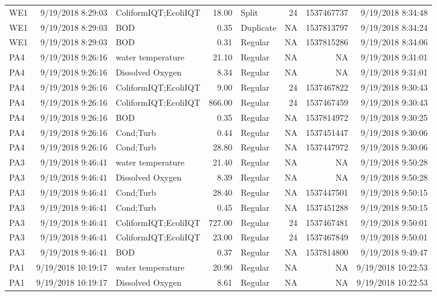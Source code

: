 \documentclass[
  letterpaper,
  DIV=11,
  numbers=noendperiod]{scrartcl}
\begin{document}
\begin{longtable*}{lrlrlrrr}
WE1 & 9/19/2018 8:29:03 & ColiformIQT;EcoliIQT & 18.00 & Split & 24 & 1537467737 & 9/19/2018 8:34:48 \\ 
WE1 & 9/19/2018 8:29:03 & BOD & 0.35 & Duplicate & NA & 1537813797 & 9/19/2018 8:34:24 \\ 
WE1 & 9/19/2018 8:29:03 & BOD & 0.31 & Regular & NA & 1537815286 & 9/19/2018 8:34:06 \\ 
PA4 & 9/19/2018 9:26:16 & water temperature & 21.10 & Regular & NA & NA & 9/19/2018 9:31:01 \\ 
PA4 & 9/19/2018 9:26:16 & Dissolved Oxygen & 8.34 & Regular & NA & NA & 9/19/2018 9:31:01 \\ 
PA4 & 9/19/2018 9:26:16 & ColiformIQT;EcoliIQT & 9.00 & Regular & 24 & 1537467822 & 9/19/2018 9:30:43 \\ 
PA4 & 9/19/2018 9:26:16 & ColiformIQT;EcoliIQT & 866.00 & Regular & 24 & 1537467459 & 9/19/2018 9:30:43 \\ 
PA4 & 9/19/2018 9:26:16 & BOD & 0.35 & Regular & NA & 1537814972 & 9/19/2018 9:30:25 \\ 
PA4 & 9/19/2018 9:26:16 & Cond;Turb & 0.44 & Regular & NA & 1537451447 & 9/19/2018 9:30:06 \\ 
PA4 & 9/19/2018 9:26:16 & Cond;Turb & 28.80 & Regular & NA & 1537447972 & 9/19/2018 9:30:06 \\ 
PA3 & 9/19/2018 9:46:41 & water temperature & 21.40 & Regular & NA & NA & 9/19/2018 9:50:28 \\ 
PA3 & 9/19/2018 9:46:41 & Dissolved Oxygen & 8.39 & Regular & NA & NA & 9/19/2018 9:50:28 \\ 
PA3 & 9/19/2018 9:46:41 & Cond;Turb & 28.40 & Regular & NA & 1537447501 & 9/19/2018 9:50:15 \\ 
PA3 & 9/19/2018 9:46:41 & Cond;Turb & 0.45 & Regular & NA & 1537451288 & 9/19/2018 9:50:15 \\ 
PA3 & 9/19/2018 9:46:41 & ColiformIQT;EcoliIQT & 727.00 & Regular & 24 & 1537467481 & 9/19/2018 9:50:01 \\ 
PA3 & 9/19/2018 9:46:41 & ColiformIQT;EcoliIQT & 23.00 & Regular & 24 & 1537467849 & 9/19/2018 9:50:01 \\ 
PA3 & 9/19/2018 9:46:41 & BOD & 0.37 & Regular & NA & 1537814800 & 9/19/2018 9:49:47 \\ 
PA1 & 9/19/2018 10:19:17 & water temperature & 20.90 & Regular & NA & NA & 9/19/2018 10:22:53 \\ 
PA1 & 9/19/2018 10:19:17 & Dissolved Oxygen & 8.61 & Regular & NA & NA & 9/19/2018 10:22:53 \\ 

\end{longtable*}
\end{document}
